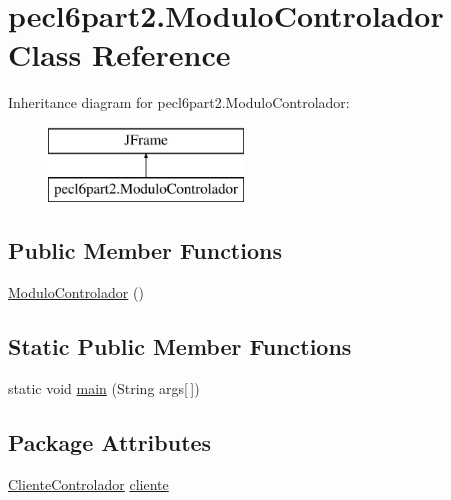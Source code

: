 \hypertarget{classpecl6part2_1_1_modulo_controlador}{}\section{pecl6part2.\+Modulo\+Controlador Class Reference}
\label{classpecl6part2_1_1_modulo_controlador}
Inheritance diagram for pecl6part2.\+Modulo\+Controlador\+:\begin{figure}[H]
\begin{center}
\leavevmode
\includegraphics[height=2.000000cm]{classpecl6part2_1_1_modulo_controlador}
\end{center}
\end{figure}
\subsection*{Public Member Functions}
\begin{DoxyCompactItemize}
\item 
\mbox{\hyperlink{classpecl6part2_1_1_modulo_controlador_ae58d9d09e586f247facba0caab686943}{Modulo\+Controlador}} ()
\end{DoxyCompactItemize}
\subsection*{Static Public Member Functions}
\begin{DoxyCompactItemize}
\item 
static void \mbox{\hyperlink{classpecl6part2_1_1_modulo_controlador_aceaf216d4144b2ef405fe43d5d6ea8e5}{main}} (String args\mbox{[}$\,$\mbox{]})
\end{DoxyCompactItemize}
\subsection*{Package Attributes}
\begin{DoxyCompactItemize}
\item 
\mbox{\hyperlink{classpecl6part2_1_1_cliente_controlador}{Cliente\+Controlador}} \mbox{\hyperlink{classpecl6part2_1_1_modulo_controlador_a62308c2ac095ab8b16d1478b2577891e}{cliente}}
\end{DoxyCompactItemize}
